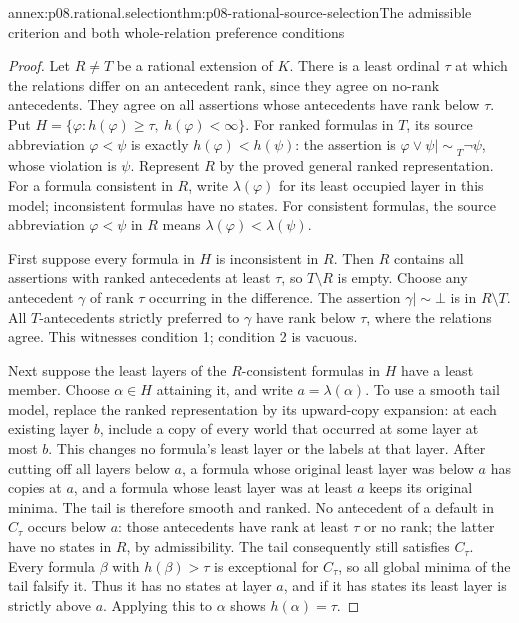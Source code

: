 \begin{annexitem}{annex:p08.rational.selection}{thm:p08-rational-source-selection}{The admissible criterion and both whole-relation preference conditions}
\begin{proof}
Let \(R\ne T\) be a rational extension of \(K\). There is a least
ordinal \(\tau\) at which the relations differ on an antecedent
rank, since they agree on no-rank antecedents. They agree on all
assertions whose antecedents have rank below \(\tau\).
Put \(H=\{\varphi:h(\varphi)\geq\tau,\ h(\varphi)<\infty\}\).
For ranked formulas in \(T\), its source abbreviation
\(\varphi<\psi\) is exactly \(h(\varphi)<h(\psi)\):
the assertion is \(\varphi\vee\psi\mathrel{|\!\sim}_T\neg\psi\),
whose violation is \(\psi\). Represent \(R\) by the proved
general ranked representation. For a formula consistent in \(R\),
write \(\lambda(\varphi)\) for its least occupied layer in this
model; inconsistent formulas have no states. For consistent formulas,
the source abbreviation \(\varphi<\psi\) in \(R\) means
\(\lambda(\varphi)<\lambda(\psi)\).

First suppose every formula in \(H\) is inconsistent in \(R\).
Then \(R\) contains all assertions with ranked antecedents at least
\(\tau\), so \(T\setminus R\) is empty. Choose any antecedent
\(\gamma\) of rank \(\tau\) occurring in the difference.
The assertion \(\gamma\mathrel{|\!\sim}\bot\) is in
\(R\setminus T\). All \(T\)-antecedents strictly preferred to
\(\gamma\) have rank below \(\tau\), where the relations agree.
This witnesses condition 1; condition 2 is vacuous.

Next suppose the least layers of the \(R\)-consistent formulas in
\(H\) have a least member. Choose \(\alpha\in H\) attaining it,
and write \(a=\lambda(\alpha)\). To use a smooth tail model, replace
the ranked representation by its upward-copy expansion: at each
existing layer \(b\), include a copy of every world that occurred at
some layer at most \(b\). This changes no formula's least layer or
the labels at that layer. After cutting off all layers below \(a\),
a formula whose original least layer was below \(a\) has copies
at \(a\), and a formula whose least layer was at least \(a\)
keeps its original minima. The tail is therefore smooth and ranked.
No antecedent of a default in \(C_\tau\) occurs below \(a\):
those antecedents have rank at least \(\tau\) or no rank; the
latter have no states in \(R\), by admissibility. The tail consequently
still satisfies \(C_\tau\).
Every formula \(\beta\) with \(h(\beta)>\tau\) is exceptional
for \(C_\tau\), so all global minima of the tail falsify it.
Thus it has no states at layer \(a\), and if it has states its
least layer is strictly above \(a\). Applying this to \(\alpha\)
shows \(h(\alpha)=\tau\).


\end{proof}
\end{annexitem}
